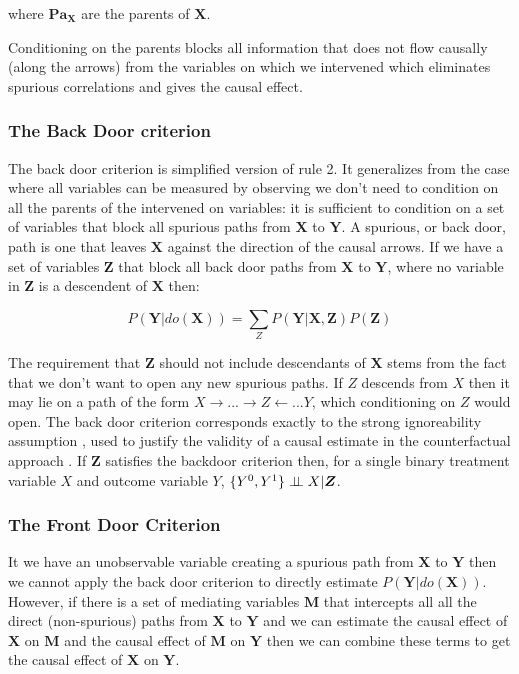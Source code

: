 \documentclass[11pt,a4paper]{article}
\begin{document}
where $\boldsymbol{Pa_{X}}$ are the parents of $\boldsymbol{X}$.


Conditioning on the parents blocks all information that does not flow causally (along the arrows) from the variables on which we intervened which eliminates spurious correlations and gives the causal effect. 

\subsubsection{The Back Door criterion}
The back door criterion is simplified version of rule 2. It generalizes from the case where all variables can be measured by observing we don't need to condition on all the parents of the intervened on variables: it is sufficient to condition on a set of variables that block all spurious paths from $\boldsymbol{X}$ to $\boldsymbol{Y}$. A spurious, or back door, path is one that leaves $\boldsymbol{X}$ against the direction of the causal arrows. If we have a set of variables $\boldsymbol{Z}$ that block all back door paths from $\boldsymbol{X}$ to $\boldsymbol{Y}$, where no variable in $\boldsymbol{Z}$ is a descendent of $\boldsymbol{X}$ then:

\begin{equation}
P(\boldsymbol{Y}|do(\boldsymbol{X})) = \sum_{Z}{P(\boldsymbol{Y}|\boldsymbol{X},\boldsymbol{Z})P(\boldsymbol{Z})}
\end{equation}

The requirement that $\boldsymbol{Z}$ should not include descendants of $\boldsymbol{X}$ stems from the fact that we don't want to open any new spurious paths. If $Z$ descends from $X$ then it may lie on a path of the form $X \rightarrow...\rightarrow Z \leftarrow... Y$, which conditioning on $Z$ would open. The back door criterion corresponds exactly to the strong ignoreability assumption \cite{Rosenbaum1983}, used to justify the validity of a causal estimate in the counterfactual approach . If $\boldsymbol{Z}$ satisfies the backdoor criterion then, for a single binary treatment variable $X$ and outcome variable $Y$, $\{Y^{0},Y^{1}\} \perp\!\!\!\perp X | \boldsymbol{Z}$. 
 
\subsubsection{The Front Door Criterion}
It we have an unobservable variable creating a spurious path from $\boldsymbol{X}$ to $\boldsymbol{Y}$ then we cannot apply the back door criterion to directly estimate $P(\boldsymbol{Y}|do(\boldsymbol{X}))$. However, if there is a set of mediating variables $\boldsymbol{M}$ that intercepts all all the direct (non-spurious) paths from $\boldsymbol{X}$ to $\boldsymbol{Y}$ and we can estimate the causal effect of $\boldsymbol{X}$ on $\boldsymbol{M}$ and the causal effect of $\boldsymbol{M}$ on $\boldsymbol{Y}$ then we can combine these terms to get the causal effect of $\boldsymbol{X}$ on $\boldsymbol{Y}$. 
\end{document}
